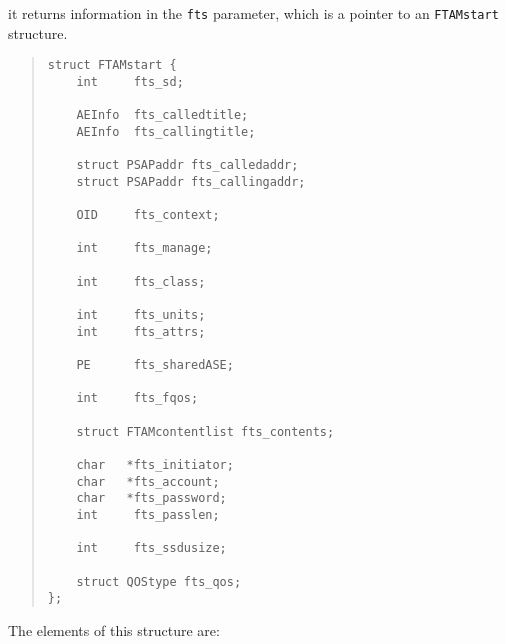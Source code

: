 it returns information in the \verb"fts" parameter,
which is a pointer to an \verb"FTAMstart" structure.
\begin{quote}\small\begin{verbatim}
struct FTAMstart {
    int     fts_sd;

    AEInfo  fts_calledtitle;
    AEInfo  fts_callingtitle;

    struct PSAPaddr fts_calledaddr;
    struct PSAPaddr fts_callingaddr;

    OID     fts_context;

    int     fts_manage;

    int     fts_class;

    int     fts_units;
    int     fts_attrs;

    PE      fts_sharedASE;

    int     fts_fqos;

    struct FTAMcontentlist fts_contents;

    char   *fts_initiator;
    char   *fts_account;
    char   *fts_password;
    int     fts_passlen;

    int     fts_ssdusize;

    struct QOStype fts_qos;
};
\end{verbatim}\end{quote}
The elements of this structure are:
